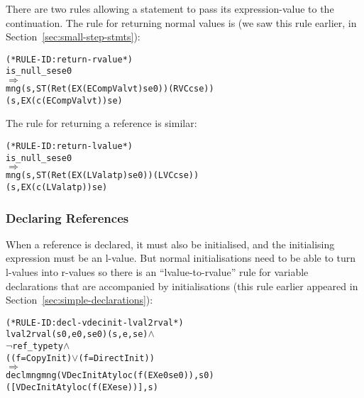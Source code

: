 \documentclass[11pt]{article}
\begin{document}
There are two rules allowing a  statement to pass its
expression-value to the continuation.  The rule for returning normal
values is  (we saw this rule earlier, in
Section~\ref{sec:small-step-stmts}):
\begin{center}
\begin{minipage}{\textwidth}
%
\begin{alltt}
(* RULE-ID: return-rvalue *)
     is_null_se se0
   \(\Rightarrow\)
     mng (s, ST (Ret (EX (ECompVal v t) se0)) (RVC c se))
         (s, EX (c (ECompVal v t)) se)

\end{alltt}
\end{minipage}
\end{center}

\smallskip\noindent
The rule for returning a reference  is similar:
\begin{center}
\begin{minipage}{\textwidth}
%
\label{rule:return-lvalue}
\begin{alltt}
(* RULE-ID: return-lvalue *)
     is_null_se se0
   \(\Rightarrow\)
     mng (s, ST (Ret (EX (LVal a t p) se0)) (LVC c se))
         (s, EX (c (LVal a t p)) se)

\end{alltt}
\end{minipage}
\end{center}

\subsubsection{Declaring References}

When a reference is declared, it must also be initialised, and the
initialising expression must be an l-value.  But normal
initialisations need to be able to turn l-values into r-values so
there is an ``lvalue-to-rvalue'' rule for variable declarations that
are accompanied by initialisations (this rule earlier appeared in
Section~\ref{sec:simple-declarations}):
\begin{center}
\begin{minipage}{\textwidth}
%
\begin{alltt}
(* RULE-ID: decl-vdecinit-lval2rval *)
     lval2rval (s0,e0,se0) (s,e,se) \(\land\)
     \(\neg\)ref_type ty \(\land\)
     ((f = CopyInit) \(\lor\) (f = DirectInit))
   \(\Rightarrow\)
     declmng mng (VDecInitA ty loc (f (EX e0 se0)), s0)
                 ([VDecInitA ty loc (f (EX e se))], s)
\end{alltt}
  \end{minipage}
\end{center}
\end{document}
